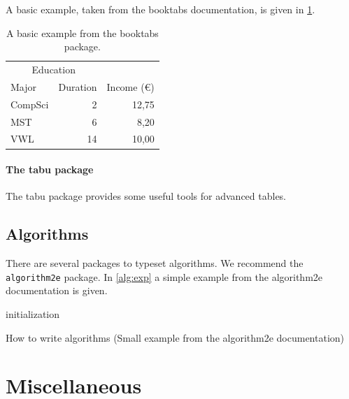 \documentclass[../{{cookiecutter.project_slug}}.tex]{subfiles}
\begin{document}
    A basic  example, taken  from the booktabs  documentation, is  given in
    \cref{tab::ex}.

    \begin{table}
        \centering
        \begin{tabular}{@{}lrr@{}} 
            \toprule
            \multicolumn{2}{c}{Education}\\ \cmidrule{1-2}
            Major & Duration & Income (\euro)\\ 
            \midrule 
            CompSci & 2 & 12,75 \\ \addlinespace
            MST & 6 & 8,20 \\ \addlinespace
            VWL & 14 & 10,00\\ 
            \bottomrule
        \end{tabular}
        \caption[Table Example]{A basic example from the booktabs package.}
        \label{tab::ex}
    \end{table}

    \paragraph{The tabu package}
    The tabu package provides some useful tools for advanced tables.


    \subsection{Algorithms}
    There are several packages to typeset algorithms.
    We recommend the \verb+algorithm2e+ package.
    In \cref{alg:exp} a simple example from the algorithm2e documentation is given.

    \begin{algorithm}[t]
        \SetAlgoLined
        initialization\;
        \caption{How to write algorithms (Small example from the algorithm2e documentation)}
        \label{alg:exp}
    \end{algorithm}

    \section{Miscellaneous}
\end{document}
